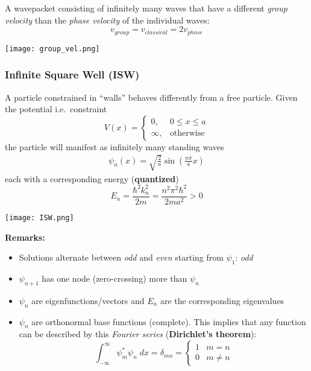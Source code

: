 
A wavepacket consisting of infinitely many waves that have a different \textit{group velocity} than the \textit{phase velocity} of the individual waves:
\noindent\begin{equation*}
    v_{group} = v_{classical} = 2v_{phase}
\end{equation*}

\begin{center}
    \texttt{[image: group\_vel.png]}
\end{center}


\subsubsection{Infinite Square Well (ISW)}\label{ssec:ISW}
A particle constrained in ``walls'' behaves differently from a free particle. Given the potential i.e.\ constraint
\noindent\begin{equation*}
    V(x)=\begin{cases}0,&0\le x\le a\\\infty,&\text{otherwise}\end{cases}
\end{equation*}
the particle will manifest as infinitely many standing waves
\noindent\begin{align*}
    \psi_{n}(x)=\sqrt{\frac{2}{a}}\sin\left(\frac{n\pi}{a}x\right)
\end{align*}
each with a corresponding energy (\textbf{quantized})
\noindent\begin{equation*}
    E_{n}=\frac{\hbar^{2}k_{n}^{2}}{2m}=\frac{n^{2}\pi^{2}\hbar^{2}}{2ma^{2}} > 0
\end{equation*}

\begin{center}
    \texttt{[image: ISW.png]}
\end{center}

\textbf{Remarks:}
\begin{itemize}
    \item Solutions alternate between \textit{odd} and \textit{even} starting from $\psi_1$: \textit{odd}
    \item $\psi_{n+1}$ has one node (zero-crossing) more than $\psi_n$
    \item $\psi_n$ are eigenfunctions/vectors and $E_n$ are the corresponding eigenvalues
    \item $\psi_n$ are orthonormal base functions (complete). This implies that any function can be  described by this \textit{Fourier series} (\textbf{Dirichlet's theorem}):
          \noindent\begin{equation*}
              \int_{-\infty}^{\infty} \psi_m^*\psi_n\; dx = \delta_{mn}= \begin{cases}
                  1 & m=n     \\
                  0 & m\neq n
              \end{cases}
          \end{equation*}
\end{itemize}

